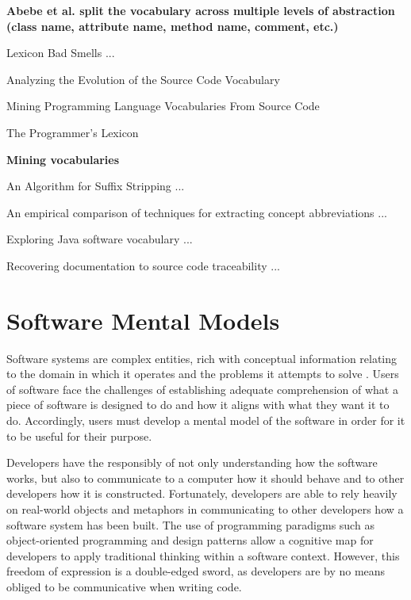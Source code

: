 \textbf{Abebe et al. split the vocabulary across multiple levels of abstraction (class name, attribute name, method name, comment, etc.)}

Lexicon Bad Smells ... \cite{Abebe09b}

Analyzing the Evolution of the Source Code Vocabulary \cite{Abebe09a}

Mining Programming Language Vocabularies From Source Code \cite{Delorey09a}
 
The Programmer's Lexicon \cite{Host07a}

\textbf{Mining vocabularies}

An Algorithm for Suffix Stripping ... \cite{Porter1997a}

An empirical comparison of techniques for extracting concept abbreviations ... \cite{Feild06a}

Exploring Java software vocabulary ... \cite{Linstead09a}

Recovering documentation to source code traceability ... \cite{Marcus03a}


\section{Software Mental Models} %
\label{sec:software_mental_models}


Software systems are complex entities, rich with conceptual information relating to the domain in which it operates and the problems it attempts to solve \cite{Biggerstaff93a}. Users of software face the challenges of establishing adequate comprehension of what a piece of software is designed to do and how it aligns with what they want it to do. Accordingly, users must develop a mental model of the software in order for it to be useful for their purpose.


Developers have the responsibly of not only understanding how the software works, but also to communicate to a computer how it should behave and to other developers how it is constructed. Fortunately, developers are able to rely heavily on real-world objects and metaphors in communicating to other developers how a software system has been built. The use of programming paradigms such as object-oriented programming and design patterns allow a cognitive map for developers to apply traditional thinking within a software context. However, this freedom of expression is a double-edged sword, as developers are by no means obliged to be communicative when writing code.

